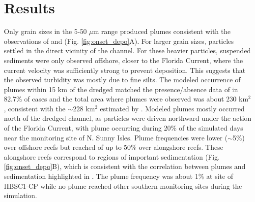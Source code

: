 \documentclass[preprint,12pt,authoryear]{elsarticle}
\begin{document}
\section{Results}

Only grain sizes in the 5-50 $\mu$m range produced plumes consistent with the observations of \cite{barnes2015sediment} and \cite{cunning2019extensive} (Fig. \ref{fig:onset_depo}A). For larger grain sizes, particles settled in the direct vicinity of the channel. For these heavier particles, suspended sediments were only observed offshore, closer to the Florida Current, where the current velocity was sufficiently strong to prevent deposition. This suggests that the observed turbidity was mostly due to fine silts. The modeled occurrence of plumes within 15 km of the dredged matched the presence/absence data of \cite{cunning2019extensive} in 82.7\% of cases and the total area where plumes were observed was about 230 km$^2$, consistent with the $\sim$228 km$^2$ estimated by \cite{barnes2015sediment}. Modeled plumes mostly occurred north of the dredged channel, as particles were driven northward under the action of the Florida Current, with plume occurring during 20\% of the simulated days near the monitoring site of N. Sunny Isles. Plume frequencies were lower ($\sim$5\%) over offshore reefs but reached of up to 50\% over alongshore reefs. These alongshore reefs correspond to regions of important sedimentation (Fig. \ref{fig:onset_depo}B), which is consistent with the correlation between plumes and sedimentation highlighted in \cite{cunning2019extensive}. The plume frequency was about 1\% at site of HBSC1-CP while no plume reached other southern monitoring sites during the simulation. 

\end{document}
